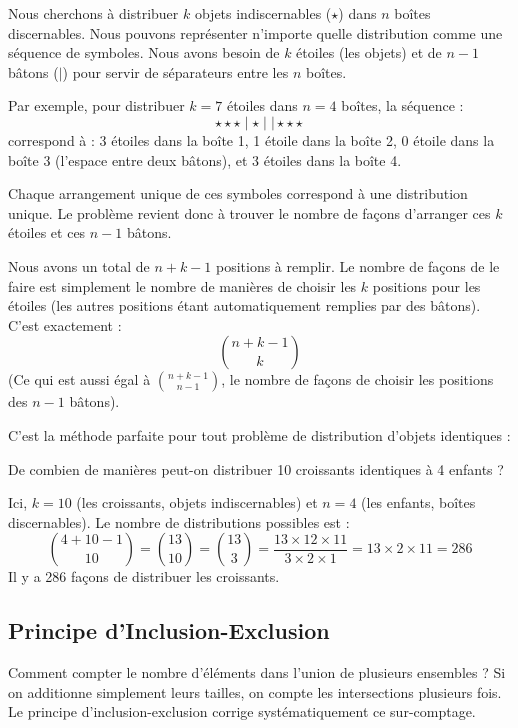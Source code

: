 \begin{proofbox}
Nous cherchons à distribuer $k$ objets indiscernables ($\star$) dans $n$ boîtes discernables.
Nous pouvons représenter n'importe quelle distribution comme une séquence de symboles. Nous avons besoin de $k$ étoiles (les objets) et de $n-1$ bâtons ($|$) pour servir de séparateurs entre les $n$ boîtes.

Par exemple, pour distribuer $k=7$ étoiles dans $n=4$ boîtes, la séquence :
$$ \star\star\star \mid \star \mid \mid \star\star\star $$
correspond à : 3 étoiles dans la boîte 1, 1 étoile dans la boîte 2, 0 étoile dans la boîte 3 (l'espace entre deux bâtons), et 3 étoiles dans la boîte 4.

Chaque arrangement unique de ces symboles correspond à une distribution unique. Le problème revient donc à trouver le nombre de façons d'arranger ces $k$ étoiles et ces $n-1$ bâtons.

Nous avons un total de $n+k-1$ positions à remplir. Le nombre de façons de le faire est simplement le nombre de manières de choisir les $k$ positions pour les étoiles (les autres positions étant automatiquement remplies par des bâtons).
C'est exactement :
$$ \binom{n+k-1}{k} $$
(Ce qui est aussi égal à $\binom{n+k-1}{n-1}$, le nombre de façons de choisir les positions des $n-1$ bâtons).
\end{proofbox}

C'est la méthode parfaite pour tout problème de distribution d'objets identiques :

\begin{examplebox}
De combien de manières peut-on distribuer 10 croissants identiques à 4 enfants ?

Ici, $k=10$ (les croissants, objets indiscernables) et $n=4$ (les enfants, boîtes discernables).
Le nombre de distributions possibles est :
$$ \binom{4+10-1}{10} = \binom{13}{10} = \binom{13}{3} = \frac{13 \times 12 \times 11}{3 \times 2 \times 1} = 13 \times 2 \times 11 = 286 $$
Il y a 286 façons de distribuer les croissants.
\end{examplebox}

\subsection{Principe d'Inclusion-Exclusion}

Comment compter le nombre d'éléments dans l'union de plusieurs ensembles ? Si on additionne simplement leurs tailles, on compte les intersections plusieurs fois. Le principe d'inclusion-exclusion corrige systématiquement ce sur-comptage.

